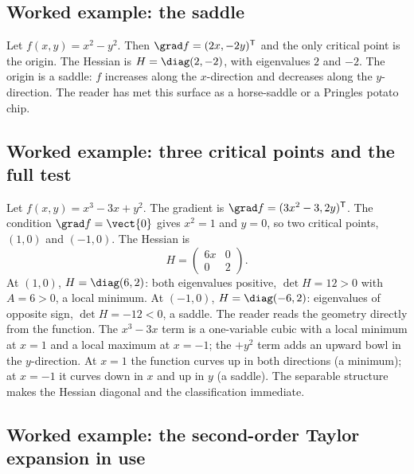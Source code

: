 

\subsection{Worked example: the saddle}

Let $f(x, y) = x^{2} - y^{2}$. Then $\grad f = (2x, -2y)^{\mathsf{T}}$
and the only critical point is the origin. The Hessian is $H =
\diag(2, -2)$, with eigenvalues $2$ and $-2$. The origin is a
saddle: $f$ increases along the $x$-direction and decreases along
the $y$-direction. The reader has met this surface as a horse-saddle
or a Pringles potato chip.

\subsection{Worked example: three critical points and the full
test}

Let $f(x, y) = x^{3} - 3 x + y^{2}$. The gradient is $\grad f =
(3 x^{2} - 3, 2 y)^{\mathsf{T}}$. The condition $\grad f = \vect{0}$
gives $x^{2} = 1$ and $y = 0$, so two critical points, $(1, 0)$ and
$(-1, 0)$. The Hessian is
\[
H = \begin{pmatrix} 6 x & 0 \\ 0 & 2 \end{pmatrix}.
\]
At $(1, 0)$, $H = \diag(6, 2)$: both eigenvalues positive,
$\det H = 12 > 0$ with $A = 6 > 0$, a local minimum. At $(-1, 0)$,
$H = \diag(-6, 2)$: eigenvalues of opposite sign, $\det H = -12 <
0$, a saddle. The reader reads the geometry directly from the
function. The $x^{3} - 3x$ term is a one-variable cubic with a local
minimum at $x = 1$ and a local maximum at $x = -1$; the $+y^{2}$ term
adds an upward bowl in the $y$-direction. At $x = 1$ the function
curves up in both directions (a minimum); at $x = -1$ it curves down
in $x$ and up in $y$ (a saddle). The separable structure makes the
Hessian diagonal and the classification immediate.

\subsection{Worked example: the second-order Taylor expansion in
use}

